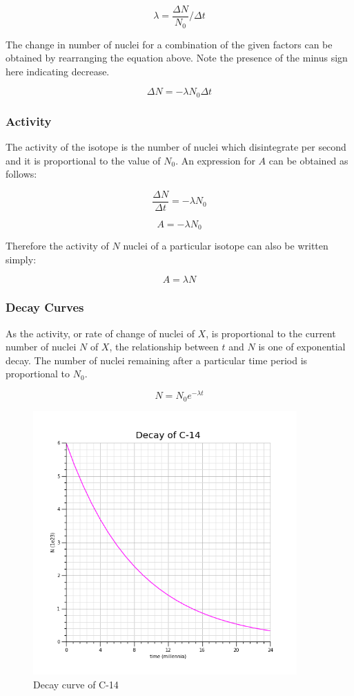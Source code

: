 \documentclass[12pt]{article}
\begin{document}
\[\lambda = \dfrac{\Delta N}{N_0}/\Delta t\]

The change in number of nuclei for a combination of the given factors can be obtained by rearranging the equation above. Note the presence of the minus sign here indicating decrease.

\[ \Delta N = - \lambda N_0 \Delta t\]

\subsubsection{Activity}
\label{sec:org20e20eb}

The activity of the isotope is the number of nuclei which disintegrate per second and it is proportional to the value of \(N_0\). An expression for \(A\) can be obtained as follows:

\[ \dfrac{\Delta N}{\Delta t} = - \lambda N_0\]

\[ A = - \lambda N_0\]

Therefore the activity of \(N\) nuclei of a particular isotope can also be written simply:

\[ A = \lambda N\]

\subsubsection{Decay Curves}
\label{sec:orgdaf49ff}

As the activity, or rate of change of nuclei of \(X\), is proportional to the current number of nuclei \(N\) of \(X\), the relationship between \(t\) and \(N\) is one of exponential decay. The number of nuclei remaining after a particular time period is proportional to \(N_0\).

\[N = N_0 e^{- \lambda t}\]

\begin{figure}[H]
\centering
\includegraphics[width=0.9\textwidth,keepaspectratio]{./images/c-14_decay.png}
\caption{Decay curve of C-14}
\end{figure}
\end{document}
